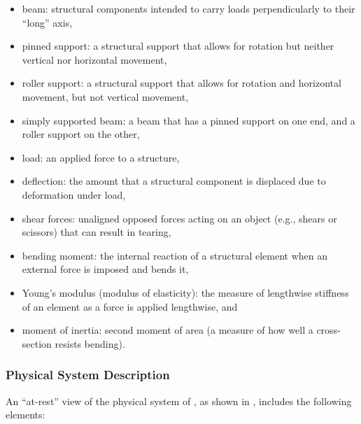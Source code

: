 \documentclass[12pt]{article}
\begin{document}
\begin{itemize}

    \item beam: structural components intended to carry loads perpendicularly to
          their ``long'' axis\nc{},

    \item pinned support: a structural support that allows for rotation but
          neither vertical nor horizontal movement\nc{},

    \item roller support: a structural support that allows for rotation and
          horizontal movement, but not vertical movement\nc{},

    \item simply supported beam: a beam that has a pinned support on one end,
          and a roller support on the other\nc{},

    \item load: an applied force to a structure\nc{},

    \item deflection: the amount that a structural component is displaced due to
          deformation under load\nc{},

    \item shear forces: unaligned opposed forces acting on an object (e.g.,
          shears or scissors) that can result in tearing\nc{},

    \item bending moment: the internal reaction of a structural element when an
          external force is imposed and bends it\nc{},

    \item Young's modulus (modulus of elasticity): the measure of lengthwise
          stiffness of an element as a force is applied lengthwise\nc{}, and

    \item moment of inertia: second moment of area (a measure of how well a
          cross-section resists bending)\cite{SmithAdviceAndDiscussion2023}.

\end{itemize}

\subsubsection{Physical System Description}
\label{sec_phySystDescrip}

An ``at-rest'' view of the physical system of \progname{}, as shown in
, includes the following elements:
\end{document}
